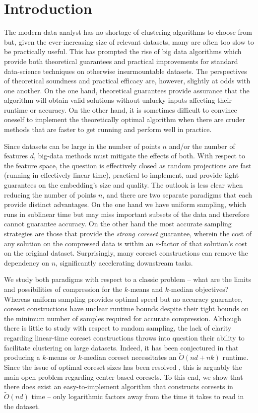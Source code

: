 \section{Introduction}

The modern data analyst has no shortage of clustering algorithms to choose from but, given the ever-increasing size of relevant datasets, many are often
too slow to be practically useful. This has prompted the rise of big data algorithms which provide both theoretical guarantees and
practical improvements for standard data-science techniques on otherwise insurmountable datasets. The perspectives
of theoretical soundness and practical efficacy are, however, slightly at odds with one another. On the one hand, theoretical guarantees provide assurance that
the algorithm will obtain valid solutions without unlucky inputs affecting their runtime or accuracy. On the other hand, it is sometimes difficult to convince
oneself to implement the theoretically optimal algorithm when there are cruder methods that are faster to get running and perform well in practice.

Since datasets can be large in the number of points $n$ and/or the number of features $d$, big-data methods must mitigate the effects of both.
With respect to the feature space, the question is effectively closed as random projections are fast (running in effectively linear time), practical to
implement, and provide tight guarantees on the embedding's size and quality. The outlook is less clear when reducing the number of points $n$, and there are
two separate paradigms that each provide distinct advantages.  On the one hand we have uniform sampling, which runs in sublinear time but may miss important subsets of
the data and therefore cannot guarantee accuracy.  On the other hand the most accurate sampling strategies are those that provide the \emph{strong coreset}
guarantee, wherein the cost of any solution on the compressed data is within an $\varepsilon$-factor of that solution's cost on the original dataset.
Surprisingly, many coreset constructions can remove the dependency on $n$, significantly accelerating downstream tasks.

We study both paradigms with respect to a classic problem -- what are the limits and possibilities of compression for the $k$-means and $k$-median objectives?
Whereas uniform sampling provides optimal speed but no accuracy guarantee, coreset constructions have
unclear runtime bounds despite their tight bounds on the minimum number of samples required for accurate compression. Although there is little to study with respect to random
sampling, the lack of clarity regarding linear-time coreset constructions throws into question their ability to facilitate clustering on large datasets.
Indeed, it has been conjectured in \cite{DSWY22} that producing a $k$-means or $k$-median coreset necessitates an $\tilde{O}(nd + nk)$ runtime.
Since the issue of optimal coreset sizes has been resolved \cite{CSS21,CLSSS22,HLW23}, this is arguably the main open problem regarding center-based coresets. To this end, we show that
there does exist an easy-to-implement algorithm that constructs coresets in $\tilde{O}(nd)$ time -- only logarithmic factors away from the time it takes to read
in the dataset.

